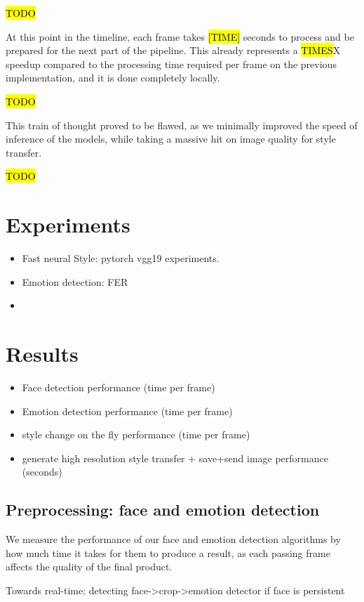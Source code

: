 \documentclass[journal,onecolumn]{IEEEtran}
\begin{document}
\hl{TODO}


At this point in the timeline, each frame takes \hl{[TIME]} seconds to process and be prepared for the next part of the pipeline. This already represents a \hl{TIMES}X speedup compared to the processing time required per frame on the previous implementation, and it is done completely locally.


\hl{TODO}


This train of thought proved to be flawed, as we minimally improved the speed of inference of the models, while taking a massive hit on image quality for style transfer.

\hl{TODO}


\section{Experiments}

\begin{itemize}
  \item Fast neural Style: pytorch vgg19 experiments.
  \item Emotion detection: FER
  \item 
\end{itemize}


\section{Results}
\begin{itemize}
  \item Face detection performance (time per frame)
  \item Emotion detection performance (time per frame)
  \item style change on the fly performance (time per frame)
  \item generate high resolution style transfer + save+send image performance (seconds)
\end{itemize}

\subsection{Preprocessing: face and emotion detection}

We measure the performance of our face and emotion detection algorithms by how much time it takes for them to produce a result, as each passing frame affects the quality of the final product. 

Towards real-time: detecting face->crop->emotion detector if face is persistent 
\end{document}
